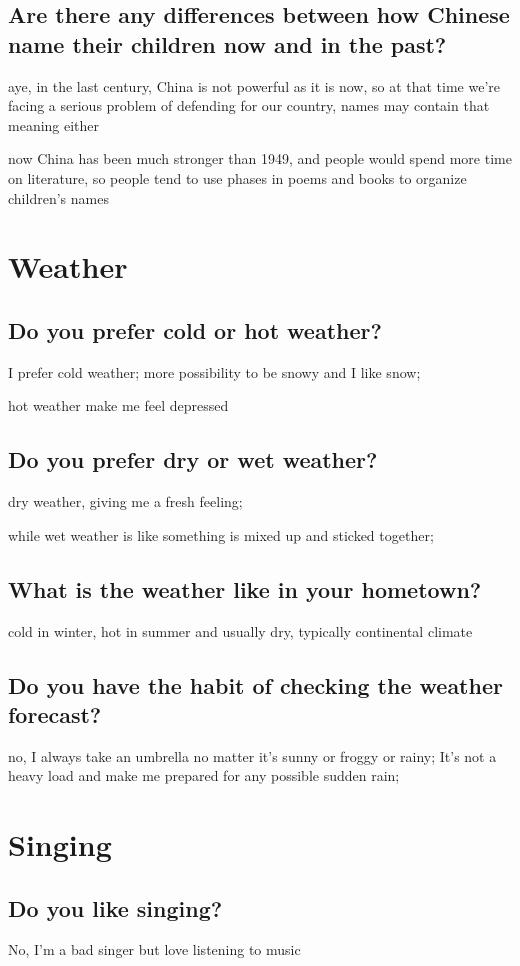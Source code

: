 \documentclass[conference]{IEEEtran}
\begin{document}
\subsection{Are there any differences between how Chinese name their
children now and in the past?}
aye, in the last century, China is not powerful as it is now, so at that time
we're facing a serious problem of defending for our country, names may contain
that meaning either

now China has been much stronger than 1949, and people would spend more time
on literature, so people tend to use phases in poems and books to 
organize children's names

\section{Weather}
\subsection{Do you prefer cold or hot weather?}
I prefer cold weather; more possibility to be snowy and I like snow;

hot weather make me feel depressed
\subsection{Do you prefer dry or wet weather?}
dry weather, giving me a fresh feeling;

while wet weather is like something is mixed up and sticked together;
\subsection{What is the weather like in your hometown?}
cold in winter, hot in summer and usually dry, typically continental climate
\subsection{Do you have the habit of checking the weather forecast?}
no, I always take an umbrella no matter it's sunny or froggy or rainy;
It's not a heavy load and make me prepared for any possible sudden rain;

\section{Singing}
\subsection{Do you like singing?}
No, I'm a bad singer but love listening to music
\end{document}
